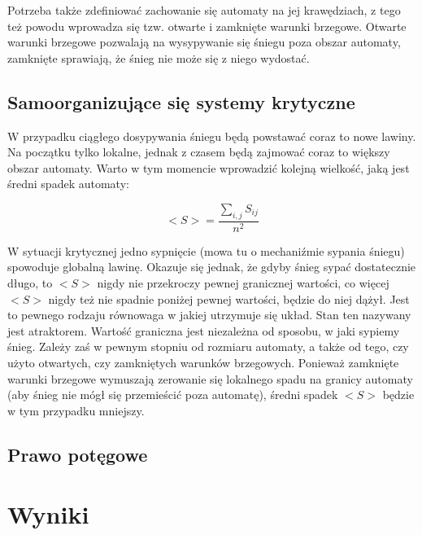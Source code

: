 \documentclass{article}
\begin{document}
		Potrzeba także zdefiniować zachowanie się automaty na jej krawędziach, z tego też powodu wprowadza się tzw. otwarte i zamknięte warunki brzegowe. Otwarte warunki brzegowe pozwalają na 
		wysypywanie się śniegu poza obszar automaty, zamknięte sprawiają, że śnieg nie może się z niego wydostać. 
						
	\subsection{Samoorganizujące się systemy krytyczne}
		
		W przypadku ciągłego dosypywania śniegu będą powstawać coraz to nowe lawiny. Na początku tylko lokalne, jednak z czasem będą zajmować coraz to większy obszar automaty. Warto w tym momencie 
		wprowadzić kolejną wielkość, jaką jest średni spadek automaty: 

			\[ <S> = \frac{ \sum_{i, j}^{} S_{i j} }{n^2} \] 

		W sytuacji krytycznej jedno sypnięcie (mowa tu o mechaniźmie sypania śniegu) spowoduje globalną lawinę. Okazuje się jednak, że gdyby śnieg sypać dostatecznie długo, to $<S>$ nigdy nie przekroczy
		pewnej granicznej wartości, co więcej $<S>$ nigdy też nie spadnie poniżej pewnej wartości, będzie do niej dążył. Jest to pewnego rodzaju równowaga w jakiej utrzymuje się układ. Stan ten nazywany jest atraktorem. Wartość graniczna jest niezależna od sposobu, 
		w jaki sypiemy śnieg. Zależy zaś w pewnym stopniu od rozmiaru automaty, a także od tego, czy użyto otwartych, czy zamkniętych warunków brzegowych. Ponieważ zamknięte warunki brzegowe
		wymuszają zerowanie się lokalnego spadu na granicy automaty (aby śnieg nie mógł się przemieścić poza automatę), średni spadek $<S>$ będzie w tym przypadku mniejszy.
		
	\subsection{Prawo potęgowe}
		
\section{Wyniki}
\end{document}
